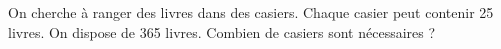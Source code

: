 \documentclass[exercice]{thedocument}%
\begin{document}
%
On cherche à ranger des livres dans des casiers. Chaque casier peut contenir
25 livres. On dispose de 365 livres. Combien de casiers sont nécessaires ? 
\end{document}
